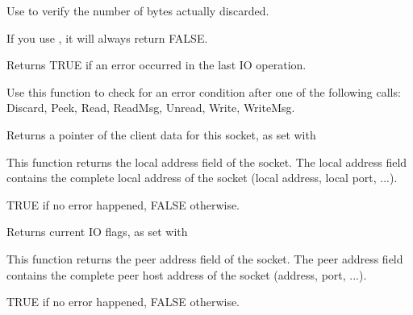Use  to verify the number of bytes actually discarded.

If you use , it will always return FALSE.

%
%
\label{wxsocketbaseerror}


Returns TRUE if an error occurred in the last IO operation.

Use this function to check for an error condition after one of the
following calls: Discard, Peek, Read, ReadMsg, Unread, Write, WriteMsg.

%
%
\label{wxsocketbasegetclientdata}


Returns a pointer of the client data for this socket, as set with 

%
%
\label{wxsocketbasegetlocal}


This function returns the local address field of the socket. The local
address field contains the complete local address of the socket (local
address, local port, ...).


TRUE if no error happened, FALSE otherwise.

%
%
\label{wxsocketbasegetflags}


Returns current IO flags, as set with 

%
%
\label{wxsocketbasegetpeer}


This function returns the peer address field of the socket. The peer 
address field contains the complete peer host address of the socket
(address, port, ...).


TRUE if no error happened, FALSE otherwise.

%
%
\label{wxsocketbaseinterruptwait}

